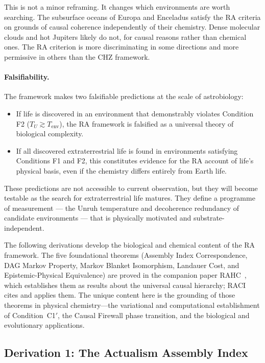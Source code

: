 \documentclass[11pt,a4paper]{article}
\theoremstyle{plain}
\theoremstyle{definition}
\theoremstyle{remark}
\begin{document}
This is not a minor reframing. It changes which environments are worth
searching. The subsurface oceans of Europa and Enceladus satisfy the RA
criteria on grounds of causal coherence independently of their chemistry.
Dense molecular clouds and hot Jupiters likely do not, for causal reasons
rather than chemical ones. The RA criterion is more discriminating in some
directions and more permissive in others than the CHZ framework.

\paragraph{Falsifiability.}
The framework makes two falsifiable predictions at the scale of astrobiology:
\begin{itemize}[noitemsep]
  \item If life is discovered in an environment that demonstrably violates
  Condition F2 ($T_U \gtrsim T_{\mathrm{env}}$), the RA framework is falsified
  as a universal theory of biological complexity.
  \item If all discovered extraterrestrial life is found in environments
  satisfying Conditions F1 and F2, this constitutes evidence for the RA
  account of life's physical basis, even if the chemistry differs
  entirely from Earth life.
\end{itemize}
These predictions are not accessible to current observation, but they will
become testable as the search for extraterrestrial life matures. They define
a programme of measurement --- the Unruh temperature and decoherence
redundancy of candidate environments --- that is physically motivated and
substrate-independent.


\label{sec:math}

The following derivations develop the biological and chemical content of the RA
framework. The five foundational theorems (Assembly Index Correspondence,
DAG Markov Property, Markov Blanket Isomorphism, Landauer Cost, and
Epistemic-Physical Equivalence) are proved in the companion paper
RAHC~\citep{Sandeman2026RAHC}, which establishes them as results about the
universal causal hierarchy; RACI cites and applies them. The unique content
here is the grounding of those theorems in physical chemistry---the variational
and computational establishment of Condition~C1$'$, the Causal Firewall phase
transition, and the biological and evolutionary applications.

\subsection{Derivation 1: The Actualism Assembly Index}
\label{sec:assembly}
\end{document}
